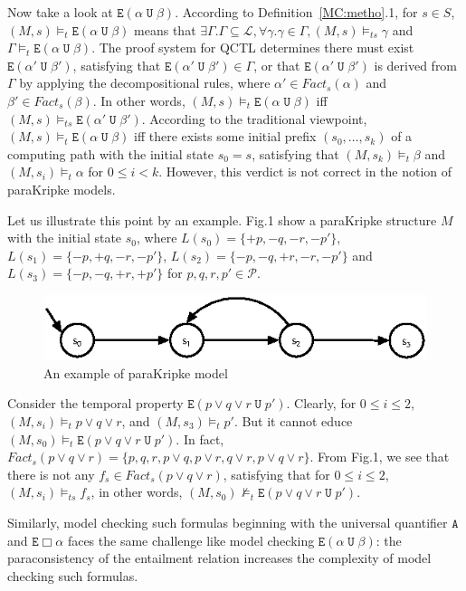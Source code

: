 \documentclass{entcs}
\begin{document}
Now take a look at $\texttt{E}(\alpha\;\texttt{U}\;\beta)$.
According to Definition~\ref{MC:metho}.1, for $s\in S$,
$(M,s)\models_t\texttt{E}(\alpha\;\texttt{U}\;\beta)$ means that
$\exists
\Gamma.\Gamma\subseteq\mathcal{L},\forall\gamma.\gamma\in\Gamma,(M,s)\models_{ts}\gamma$
and $\Gamma\models_t\texttt{E}(\alpha\;\texttt{U}\;\beta)$. The
proof system for QCTL determines there must exist
$\texttt{E}(\alpha'\;\texttt{U}\;\beta')$, satisfying that
$\texttt{E}(\alpha'\;\texttt{U}\;\beta')\in\Gamma$, or that
$\texttt{E}(\alpha'\;\texttt{U}\;\beta')$ is derived from $\Gamma$
by applying the decompositional rules, where $\alpha'\in
Fact_s(\alpha)$ and $\beta'\in Fact_s(\beta)$. In other words,
$(M,s)\models_t\texttt{E}(\alpha\;\texttt{U}\;\beta)$
 iff $(M,s)\models_{ts}\texttt{E}(\alpha'\;\texttt{U}\;\beta').$
 According
to the traditional viewpoint,
$(M,s)\models_t\texttt{E}(\alpha\;\texttt{U}\;\beta)$ iff there
exists some initial prefix $(s_0,\ldots,s_k)$ of a computing path
with the initial state $s_0=s$, satisfying that
$(M,s_k)\models_t\beta$ and $(M,s_i)\models_t\alpha$ for $0\leq
i<k$. However, this verdict is not correct in the notion of
paraKripke models.

Let us illustrate this point by an example. Fig.1 show a
paraKripke structure $M$ with the initial state $s_0$, where
$L(s_0)=\{+p,-q,-r,-p'\}$,$L(s_1)=\{-p,+q,-r,-p'\}$,
$L(s_2)=\{-p,-q,+r,-r,-p'\}$ and $L(s_3)=\{-p,-q, +r,+p'\}$ for
$p,q,r,p'\in\mathcal{P}$.
\begin{figure}
\centering\includegraphics{example.eps} \caption{An example of
paraKripke model} \label{fig:model}
\end{figure}

Consider the temporal property $\texttt{E}(p\vee q\vee
r\;\texttt{U}\;p')$. Clearly, for $0\leq i\leq 2$,
$(M,s_i)\models_{t} p\vee q\vee r$, and $(M,s_3)\models_t p'$. But
it cannot educe $(M,s_0)\models_t\texttt{E}(p\vee q\vee
r\;\texttt{U}\;p')$. In fact, $Fact_s(p\vee q\vee r)=\{p,q,r,p\vee
q,p\vee r,q\vee r,p\vee q\vee r \}$. From Fig.1, we see that there
is not any $f_s\in Fact_s(p\vee q\vee r)$, satisfying that for
$0\leq i\leq 2$, $(M,s_i)\models_{ts}f_s$, in other words,
$(M,s_0)\not\models_{t}\texttt{E}(p\vee q\vee r\;\texttt{U}\;p')$.

Similarly, model checking such formulas beginning with the
universal quantifier $\texttt{A}$ and $\texttt{E}\Box\alpha$ faces
the same challenge like model checking
$\texttt{E}(\alpha\;\texttt{U}\;\beta)$: the paraconsistency of
the entailment relation increases the complexity of model checking
such formulas.
\end{document}

